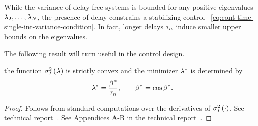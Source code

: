 {While the variance of delay-free systems is bounded for any %
positive eigenvalues $ \lambda_2,\dots,\lambda_N $,
the presence of delay constrains a stabilizing control ~\eqref{eq:cont-time-single-int-variance-condition}.
In fact,
longer delays $ \tau_n $ induce smaller upper bounds on the eigenvalues.

{The following result will turn useful in the control design.}
\begin{cor}\label{lem:optimal-variance-explicit}
	 the function $ \sigma^{2}_{\textit{I}}\left(\lambda\right) $ is strictly convex and {the minimizer} $ \lambda^* $ is {determined} by
	\begin{equation}\label{eq:optimal-variance-closed-form}
	\opteig = \frac{\beta^*}{\taun}, \qquad \beta^* = \cos\beta^*. %
	\end{equation}
\end{cor}
\begin{proof}
	Follows from standard computations over the derivatives of $ \sigma^{2}_{\textit{I}}\left(\cdot\right) $.
	\mode
	See technical report~\cite{2021arXiv210900359B}.
	\else
	See Appendices A-B in the technical report~\cite{2021arXiv210110394B}.
	\fi
\end{proof}
}